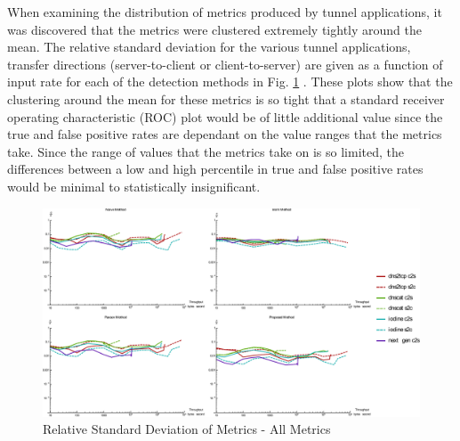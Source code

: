 \documentclass{llncs}
\begin{document}
When examining the distribution of metrics produced by tunnel applications, it
was discovered that the metrics were clustered extremely tightly around the
mean. The relative standard deviation for the various tunnel applications,
transfer directions (server-to-client or client-to-server) are given as a
function of input rate for each of the detection methods in
Fig. \ref{rsd-all}
. These
plots show that the clustering around the mean for these metrics is so tight
that a standard receiver operating characteristic (ROC) plot would be of little
additional value since the true and false positive rates are dependant on the
value ranges that the metrics take. Since the range of values that the metrics
take on is so limited, the differences between a low and high percentile in true
and false positive rates would be minimal to statistically insignificant.

\begin{figure}[h]
\centering
\includegraphics[width=\textwidth]{../figures/rsd-all.pdf}
\caption[Relative Standard Deviation of Metrics - All Metrics]{Relative Standard Deviation of Metrics - All Metrics}
\label{rsd-all}
\end{figure}

%
%
%
\end{document}
